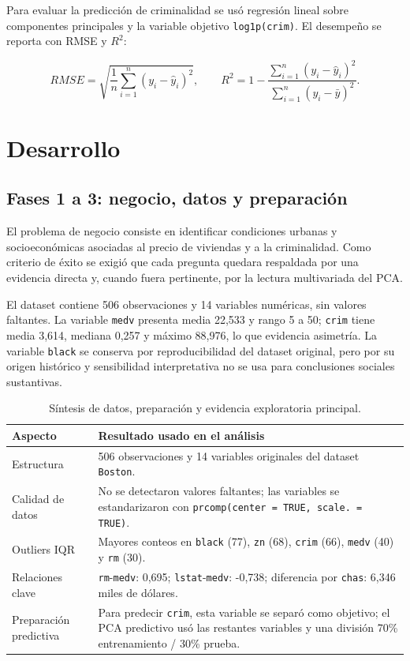 \documentclass[10pt,a4paper]{article}
\begin{document}
Para evaluar la predicción de criminalidad se usó regresión lineal sobre componentes principales y la variable objetivo \texttt{log1p(crim)}. El desempeño se reporta con RMSE y $R^{2}$:

\begin{equation}
  RMSE = \sqrt{\frac{1}{n}\sum_{i=1}^{n}(y_i - \hat{y}_i)^2}, \qquad
  R^{2} = 1 - \frac{\sum_{i=1}^{n}(y_i - \hat{y}_i)^2}{\sum_{i=1}^{n}(y_i - \bar{y})^2}.
\end{equation}

\section{Desarrollo}

\subsection{Fases 1 a 3: negocio, datos y preparación}

El problema de negocio consiste en identificar condiciones urbanas y socioeconómicas asociadas al precio de viviendas y a la criminalidad. Como criterio de éxito se exigió que cada pregunta quedara respaldada por una evidencia directa y, cuando fuera pertinente, por la lectura multivariada del PCA.

El dataset contiene 506 observaciones y 14 variables numéricas, sin valores faltantes. La variable \texttt{medv} presenta media 22,533 y rango 5 a 50; \texttt{crim} tiene media 3,614, mediana 0,257 y máximo 88,976, lo que evidencia asimetría. La variable \texttt{black} se conserva por reproducibilidad del dataset original, pero por su origen histórico y sensibilidad interpretativa no se usa para conclusiones sociales sustantivas.

\begin{table}[H]
  \centering
  \caption{Síntesis de datos, preparación y evidencia exploratoria principal.}
  \label{tab:sintesis_datos}
  \footnotesize
  \begin{tabularx}{\textwidth}{p{3.1cm} X}
    \toprule
    \textbf{Aspecto} & \textbf{Resultado usado en el análisis} \\
    \midrule
    Estructura & 506 observaciones y 14 variables originales del dataset \texttt{Boston}. \\
    Calidad de datos & No se detectaron valores faltantes; las variables se estandarizaron con \texttt{prcomp(center = TRUE, scale. = TRUE)}. \\
    Outliers IQR & Mayores conteos en \texttt{black} (77), \texttt{zn} (68), \texttt{crim} (66), \texttt{medv} (40) y \texttt{rm} (30). \\
    Relaciones clave & \texttt{rm}-\texttt{medv}: 0,695; \texttt{lstat}-\texttt{medv}: -0,738; diferencia por \texttt{chas}: 6,346 miles de dólares. \\
    Preparación predictiva & Para predecir \texttt{crim}, esta variable se separó como objetivo; el PCA predictivo usó las restantes variables y una división 70\% entrenamiento / 30\% prueba. \\
    \bottomrule
  \end{tabularx}
\end{table}
\end{document}
